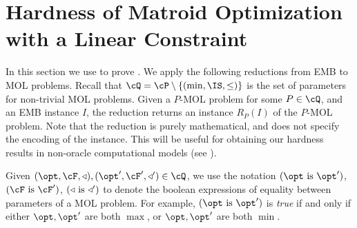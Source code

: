 \section{Hardness of Matroid Optimization with a Linear Constraint}
\label{sec:tight_absolute}
In this section we use  %
to prove . We apply the following reductions from EMB to MOL problems. Recall that $\cQ = \cP \setminus \{(\min,\IS,\leq)\}$ is the set of parameters for non-trivial MOL problems. Given a $P$-MOL problem for some $P \in \cQ$, and an EMB instance $I$, the reduction returns an instance $R_P(I)$ of the $P$-MOL problem. Note that the reduction is purely mathematical, and 
does not specify the encoding of the instance. This will be useful for obtaining our hardness results in non-oracle computational models (see ). 

Given $(\opt,\cF,\triangleleft), (\opt',\cF',\triangleleft') \in \cQ$, we use the notation $(\opt \textnormal{ is } \opt')$,  $(\cF \textnormal{ is } \cF')$, $(\triangleleft \textnormal{ is } \triangleleft')$ to denote the boolean expressions of equality between parameters of a MOL problem. For example, $(\opt \textnormal{ is } \opt')$ is {\em true} if and only if either $\opt,\opt'$ are both $\max$, or $\opt,\opt'$ are both $\min$. 



